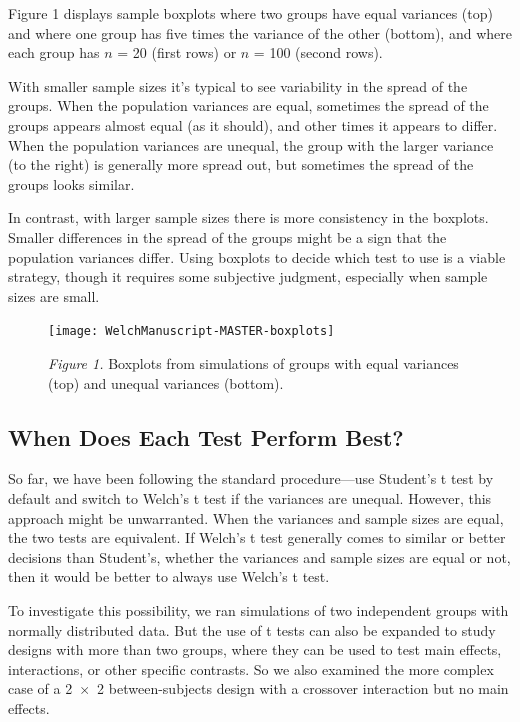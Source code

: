 \documentclass[man, noextraspace, apacite, floatsintext]{apa6}
\begin{document}
    Figure 1 displays sample boxplots where two groups have equal 
variances (top) and where one group has five times the variance of the other (bottom), and where each group has $n$ = 20 (first rows) or $n$ = 
100 (second rows). 

  With smaller 
sample sizes it's typical to see 
variability in the spread of the groups. When the population 
variances are equal,
sometimes the spread of the groups appears almost equal (as it should), 
and other times it appears to differ. When the population variances are unequal, the group with the larger variance (to the right) is generally more spread out, but sometimes the spread of the groups looks similar.

In contrast, with larger sample sizes there is more 
consistency in the boxplots. Smaller differences in the spread of the groups 
might be a sign that the population variances differ. Using boxplots
to decide which test to use
is a viable strategy, though it requires some subjective judgment,
especially when sample sizes are small.

   
\begin{figure}[!ht]
\texttt{[image: WelchManuscript-MASTER-boxplots]}

\textit{Figure 1.} Boxplots from simulations of groups with equal variances (top) and unequal 
variances (bottom).
\end{figure}

\subsection{When Does Each Test Perform Best?}

    So far, we have been following the standard procedure---use Student's t test 
by default and  switch to Welch's t test if the variances 
are unequal. However, this approach might be
unwarranted. When the variances and sample sizes are equal, the two tests are equivalent. If Welch's t test generally comes to similar or better 
decisions than Student's, whether the variances and sample sizes are equal or not, then 
it would be better to always use 
Welch's t test. 

To investigate this possibility, we ran simulations of two independent groups 
with normally distributed data.  But the use of t tests can also be expanded to study designs with more than two groups, where they can be used to test main effects, interactions, or other specific contrasts. So we also examined the more complex case of a 2~$\times$~2 between-subjects design with a crossover interaction but no main effects.
\end{document}

